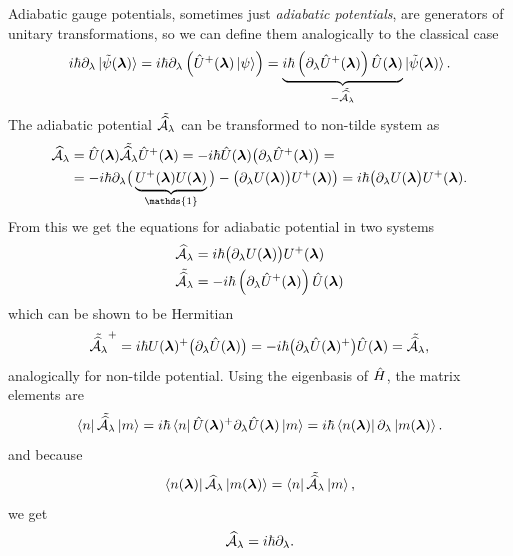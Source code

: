 Adiabatic gauge potentials, sometimes just \emph{adiabatic potentials}, are generators of unitary transformations, so we can define them analogically to the classical case
\begin{equation}
    i\hbar\partial_\lambda \ket{\tilde{\psi}(\llambda)} = i\hbar \partial_\lambda\left(\U^+(\llambda)\ket{\psi} \right)= \underbrace{i\hbar\left(\partial_\lambda \U^+(\llambda)\right)\U(\llambda)}_{-\tilde{\AA_\lambda}}\ket{\tilde{\psi}(\llambda)}.
\end{equation}
The adiabatic potential $\tilde{\AA_\lambda}$ can be transformed to non-tilde system as
\begin{equation}
    \begin{split}
        \AA_\lambda&=\U(\llambda)\tilde{\AA_\lambda}\U^+(\llambda) = -i\hbar\U(\llambda)\big(\partial_\lambda \U^+(\llambda)\big) =\\
        &= -i\hbar\partial_\lambda\big(\underbrace{U^+(\llambda)U(\llambda)}_{\mathds{1}}\big)-\big(\partial_\lambda U(\llambda)\big)U^+(\llambda) \big) =i\hbar \big(\partial_\lambda U(\llambda\big)U^+(\llambda).
    \end{split}
\end{equation}
From this we get the equations for adiabatic potential in two systems 
\begin{align}
    \AA_\lambda&=i\hbar \big(\partial_\lambda U(\llambda)\big)U^+(\llambda)
    \label{eq:adiabaticPotential}\\
    \tilde{\AA_\lambda} &= -i\hbar\left(\partial_\lambda \U^+(\llambda)\right)\U(\llambda)
    \label{eq:adiabaticPotentialTilde}
\end{align}
which can be shown to be Hermitian
\begin{equation}
     \tilde{\AA_\lambda}^+=i\hbar U(\llambda)^+\big(\partial_\lambda\U(\llambda)\big)=-i\hbar\big(\partial_\lambda\U(\llambda)^+\big)\U(\llambda) = \tilde{\AA_\lambda},
     \label{eq:counterdiabaticPotentialTwoSystems}
\end{equation}
analogically for non-tilde potential.
Using the eigenbasis of $\HH$, the matrix elements are
\begin{equation}
    \bra{n}\tilde{\AA_\lambda}\ket{m}=i\hbar\bra{n}\U(\llambda)^+\partial_\lambda\U(\llambda)\ket{m} = i\hbar\bra{n(\llambda)}\partial_\lambda\ket{m(\llambda)}.
\end{equation}
and because
\begin{equation}
    \bra{n(\llambda)}\AA_\lambda\ket{ m(\llambda)}= \bra{n}\tilde{\AA_\lambda}\ket{m},
\end{equation}
we get
\begin{equation}
    \AA_\lambda = i\hbar\partial_\lambda.
    \label{eq:adiabaticPotentialDefinition}
\end{equation}



